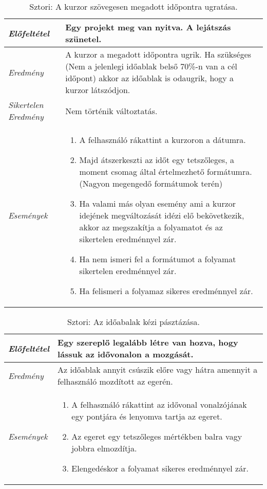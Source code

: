 \begin{table}[H]
	\centering
	\begin{tabular}{ | m{} | m{} | }
		\hline
		\emph{Előfeltétel} & Egy projekt meg van nyitva. A lejátszás szünetel. \\
		\hline
		\emph{Eredmény} & A kurzor a megadott időpontra ugrik. Ha szükséges (Nem a jelenlegi időablak belső 70\%-n van a cél időpont) akkor az időablak is odaugrik, hogy a kurzor látszódjon.  \\
		\hline
		\emph{Sikertelen Eredmény} & Nem történik változtatás.  \\
		\hline
		\hline
		\emph{Események} &
		\begin{enumerate}[itemsep=-1ex]
			\item A felhasználó rákattint a kurzoron a dátumra.
			\item Majd átszerkeszti az időt egy tetszőleges, a moment csomag által értelmezhető formátumra. (Nagyon megengedő formátumok terén)
			\item Ha valami más olyan esemény ami a kurzor idejének megváltozását idézi elő bekövetkezik, akkor az megszakítja a folyamatot és az sikertelen eredménnyel zár.
			\item Ha nem ismeri fel a formátumot a folyamat sikertelen eredménnyel zár.
			\item Ha felismeri a folyamaz sikeres eredménnyel zár.
		\end{enumerate}
		\\
		\hline
	\end{tabular}
	\caption{Sztori: A kurzor szövegesen megadott időpontra ugratása.}
	\label{tab:story-timeline-manual-jump-cursor}
\end{table}

\begin{table}[H]
	\centering
	\begin{tabular}{ | m{} | m{} | }
		\hline
		\emph{Előfeltétel} & Egy szereplő legalább létre van hozva, hogy lássuk az idővonalon a mozgását. \\
		\hline
		\emph{Eredmény} & Az időablak annyit csúszik előre vagy hátra amennyit a felhasználó mozdított az egerén. \\
		\hline
		\hline
		\emph{Események} &
		\begin{enumerate}[itemsep=-1ex]
			\item A felhasználó rákattint az idővonal vonalzójának egy pontjára és lenyomva tartja az egeret.
			\item Az egeret egy tetszőleges mértékben balra vagy jobbra elmozdítja.
			\item Elengedéskor a folyamat sikeres eredménnyel zár.
		\end{enumerate}
		\\
		\hline
	\end{tabular}
	\caption{Sztori: Az időabalak kézi pásztázása.}
	\label{tab:story-timeline-manual-pan-timeframe}
\end{table}


